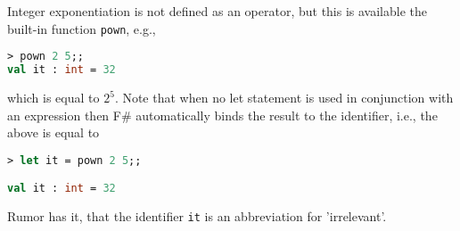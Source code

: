Integer exponentiation is not defined as an operator, but this is available the built-in function \lstinline|pown|, e.g.,
%
\begin{lstlisting}[language=fsharp,caption={fsharpi, integer exponentiation function, and the irrelevant identifier.}]
> pown 2 5;;
val it : int = 32
\end{lstlisting}
which is equal to $2^5$. Note that when no let statement is used in conjunction with an expression then F\# automatically binds the result to the  identifier, i.e., the above is equal to
%
\begin{lstlisting}[language=fsharp,caption={fsharpi, the equivalent to the irrelevant identifier.}]
  > let it = pown 2 5;;

val it : int = 32
\end{lstlisting}
Rumor has it, that the identifier \lstinline|it| is an abbreviation for 'irrelevant'.

